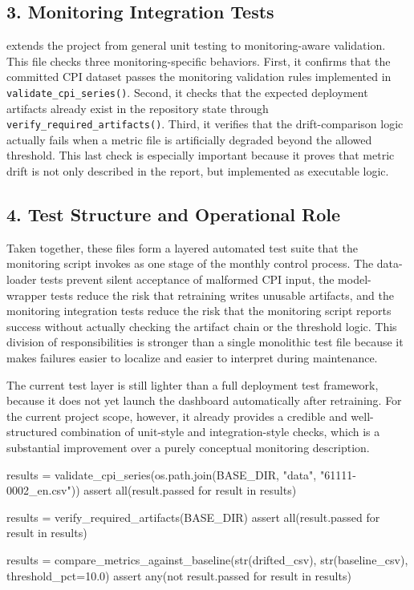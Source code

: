 \subsection*{3. Monitoring Integration Tests}

 extends the project from general unit testing to monitoring-aware validation. This file checks three monitoring-specific behaviors. First, it confirms that the committed CPI dataset passes the monitoring validation rules implemented in \texttt{validate\_cpi\_series()}. Second, it checks that the expected deployment artifacts already exist in the repository state through \texttt{verify\_required\_artifacts()}. Third, it verifies that the drift-comparison logic actually fails when a metric file is artificially degraded beyond the allowed threshold. This last check is especially important because it proves that metric drift is not only described in the report, but implemented as executable logic.

\subsection*{4. Test Structure and Operational Role}

Taken together, these files form a layered automated test suite that the monitoring script invokes as one stage of the monthly control process. The data-loader tests prevent silent acceptance of malformed CPI input, the model-wrapper tests reduce the risk that retraining writes unusable artifacts, and the monitoring integration tests reduce the risk that the monitoring script reports success without actually checking the artifact chain or the threshold logic. This division of responsibilities is stronger than a single monolithic test file because it makes failures easier to localize and easier to interpret during maintenance.

The current test layer is still lighter than a full deployment test framework, because it does not yet launch the dashboard automatically after retraining. For the current project scope, however, it already provides a credible and well-structured combination of unit-style and integration-style checks, which is a substantial improvement over a purely conceptual monitoring description.

\begin{Python}[caption={Example monitoring assertions in the test suite}, label={lst:monitoring-test-assertions}]
results = validate_cpi_series(os.path.join(BASE_DIR, "data", "61111-0002_en.csv"))
assert all(result.passed for result in results)

results = verify_required_artifacts(BASE_DIR)
assert all(result.passed for result in results)

results = compare_metrics_against_baseline(str(drifted_csv), str(baseline_csv), threshold_pct=10.0)
assert any(not result.passed for result in results)
\end{Python}

